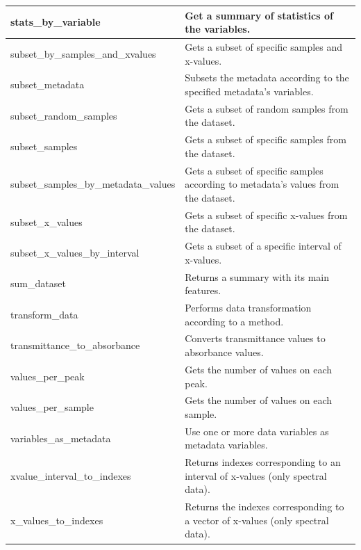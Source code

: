 \begin{scriptsize}
\begin{longtable}{|m{4.3cm}|m{11cm}|}
		\hline
		stats\_by\_variable & Get a summary of statistics of the variables. \\
		
		\hline
		subset\_by\_samples\_and\_xvalues & Gets a subset of specific samples and x-values. \\
		
		\hline
		subset\_metadata & Subsets the metadata according to the specified metadata's variables. \\
		
		\hline
		subset\_random\_samples & Gets a subset of random samples from the dataset. \\
		
		\hline
		subset\_samples & Gets a subset of specific samples from the dataset. \\
		
		\hline
		subset\_samples\_by\_metadata\_values & Gets a subset of specific samples according to metadata’s values from the dataset. \\
		
		\hline
		subset\_x\_values & Gets a subset of specific x-values from the dataset. \\
		
		\hline
		subset\_x\_values\_by\_interval & Gets a subset of a specific interval of x-values. \\
		
		\hline
		sum\_dataset & Returns a summary with its main features. \\
		
		\hline
		transform\_data & Performs data transformation according to a method. \\
		
		\hline
		transmittance\_to\_absorbance & Converts transmittance values to absorbance values. \\
		
		\hline
		values\_per\_peak & Gets the number of values on each peak. \\
		
		\hline
		values\_per\_sample & Gets the number of values on each sample. \\
		
		\hline
		variables\_as\_metadata & Use one or more data variables as metadata variables. \\
		
		\hline
		xvalue\_interval\_to\_indexes & Returns indexes corresponding to an interval of x-values (only spectral data). \\
		
		\hline
		x\_values\_to\_indexes & Returns the indexes corresponding to a vector of x-values (only spectral data). \\
		
		\hline
		
	\end{longtable}
\end{scriptsize}


